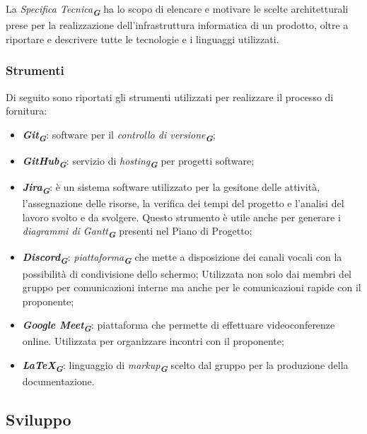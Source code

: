 \begin{enumerate}
La \emph{Specifica Tecnica}\textsubscript{\textit{\textbf{G}}} ha lo scopo di elencare e motivare le scelte architetturali prese per
la realizzazione dell’infrastruttura informatica di un prodotto, oltre a riportare e descrivere tutte le tecnologie e i linguaggi utilizzati.


\subsubsection{Strumenti}

Di seguito sono riportati gli strumenti utilizzati per realizzare il processo di fornitura:
\begin{itemize}
    \item \textbf{\emph{Git}}\textsubscript{\textit{\textbf{G}}}: software per il \emph{controllo di versione}\textsubscript{\textit{\textbf{G}}};
    \item \textbf{\emph{GitHub}}\textsubscript{\textit{\textbf{G}}}: servizio di \emph{hosting}\textsubscript{\textit{\textbf{G}}} per progetti software;
    \item \textbf{\emph{Jira}}\textsubscript{\textit{\textbf{G}}}: è un sistema software utilizzato per la gesitone delle attività, l’assegnazione delle
    risorse, la verifica dei tempi del progetto e l’analisi del lavoro svolto e da svolgere.
    Questo strumento è utile anche per generare i \emph{diagrammi di Gantt}\textsubscript{\textit{\textbf{G}}} presenti nel Piano
    di Progetto;
    \item \textbf{\emph{Discord}}\textsubscript{\textit{\textbf{G}}}: \emph{piattaforma}\textsubscript{\textit{\textbf{G}}} che mette a disposizione dei canali vocali con la possibilità di condivisione dello schermo;
    Utilizzata non solo dai membri del gruppo per comunicazioni interne ma anche per le comunicazioni rapide con il proponente;
    \item \textbf{\emph{Google Meet}}\textsubscript{\textit{\textbf{G}}}: piattaforma che permette di effettuare videoconferenze online. Utilizzata per organizzare incontri con il proponente;
    \item \textbf{\emph{\LaTeX}}\textsubscript{\textit{\textbf{G}}}: linguaggio di \emph{markup}\textsubscript{\textit{\textbf{G}}} scelto dal gruppo per la produzione della documentazione.
\end{itemize}

\subsection{Sviluppo}

\end{enumerate}
